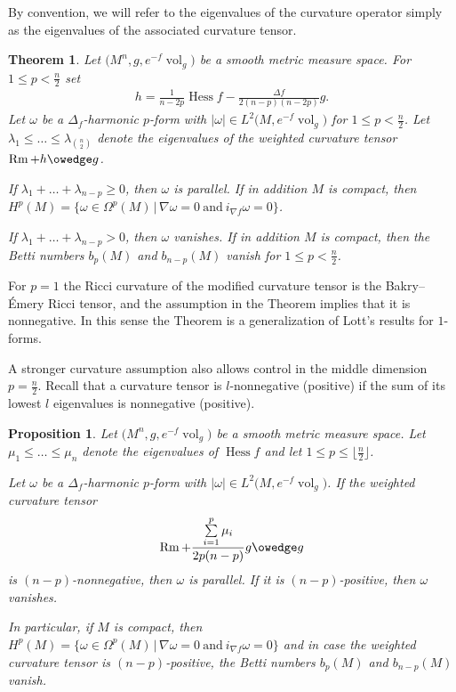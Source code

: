 \documentclass[10pt,a4paper]{amsart}
\numberwithin{equation}{section}
\newcommand{\vol}{\operatorname{vol}}
\newcommand{\Hess} {\operatorname{Hess}}
\newcommand{\Rm} {\operatorname{Rm}}
\newtheorem*{theorem*}{Theorem}\newtheorem*{proposition*}{Proposition}
\begin{document}
By convention, we will refer to the eigenvalues of the curvature operator simply as the eigenvalues of the associated curvature tensor.


\begin{theorem*}
Let $\big(M^n,g, e^{-f} \vol_g\big)$ be a smooth metric measure space. For $1 \leq p < \frac{n}{2}$ set
\begin{gather*}
h = \frac{1}{n-2p} \Hess f - \frac{\Delta f}{2(n-p)(n-2p)} g.
\end{gather*}
Let $\omega$ be a $\Delta_f$-harmonic $p$-form with $|\omega| \in L^2\big(M, e^{-f} \vol_g\big)$ for $1 \leq p < \frac{n}{2}$. Let $\lambda_1 \leq \dots \leq \lambda_{\genfrac(){0pt}{2}{n}{2}}$ denote the eigenvalues of the weighted curvature tensor $\Rm + h \owedge g$.

If $\lambda_1 + \dots + \lambda_{n-p} \geq 0$, then $\omega$ is parallel. If in addition $M$ is compact, then $H^{p}(M)= \big\lbrace \omega \in \Omega^p(M) \, \vert \, \nabla \omega =0 \ \text{and} \ i_{\nabla f} \omega = 0 \big\rbrace$.

If $\lambda_1 + \dots + \lambda_{n-p} > 0$, then $\omega$ vanishes. If in addition $M$ is compact, then the Betti numbers $b_p(M)$ and $b_{n-p}(M)$ vanish for $1 \leq p < \frac{n}{2}$.
\end{theorem*}


For $p=1$ the Ricci curvature of the modified curvature tensor is the Bakry--\'Emery Ricci tensor, and the assumption in the Theorem implies that it is nonnegative. In this sense the Theorem is a generalization of Lott's \cite{LottGeometryBETensor} results for $1$-forms.


A stronger curvature assumption also allows control in the middle dimension $p = \frac{n}{2}$. Recall that a curvature tensor is $l$-nonnegative (positive) if the sum of its lowest $l$ eigenvalues is nonnegative (positive).

\begin{proposition*}
Let $\big(M^n,g, e^{-f} \vol_g\big)$ be a smooth metric measure space. Let $\mu_1 \leq \dots \leq \mu_n$ denote the eigenvalues of $\Hess f$ and let $1 \leq p \leq \big\lfloor  \frac{n}{2}\big\rfloor$.

Let $\omega$ be a $\Delta_f$-harmonic $p$-form with $|\omega| \in L^2\big(M, e^{-f} \vol_g\big)$. If the weighted curvature tensor
\begin{gather*}
\Rm + \frac{\sum\limits_{i=1}^p \mu_i}{2p(n-p)} g \owedge g
\end{gather*}
is $(n-p)$-nonnegative, then $\omega$ is parallel. If it is $(n-p)$-positive, then $\omega$ vanishes.

In particular, if $M$ is compact, then $H^{p}(M)= \big\lbrace \omega \in \Omega^p(M) \, \vert \, \nabla \omega =0 \ \text{and} \ i_{\nabla f} \omega = 0 \big\rbrace$ and in case the weighted curvature tensor is $(n-p)$-positive, the Betti numbers $b_p(M)$ and $b_{n-p}(M)$ vanish.
\end{proposition*}
\end{document}
